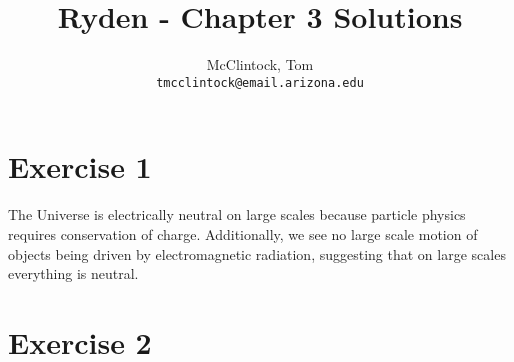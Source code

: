 \documentclass[12pt,a4paper]{article}
\author{
  McClintock, Tom\\
  \texttt{tmcclintock@email.arizona.edu}
}
\title{Ryden - Chapter 3 Solutions}
\begin{document}
\maketitle

\section{Exercise 1}
\label{sec:c2ex1}

The Universe is electrically neutral on large scales because particle physics requires conservation of charge. Additionally, we see no large scale motion of objects being driven by electromagnetic radiation, suggesting that on large scales everything is neutral.

\section{Exercise 2}
\label{sec:c2ex2}
\end{document}
